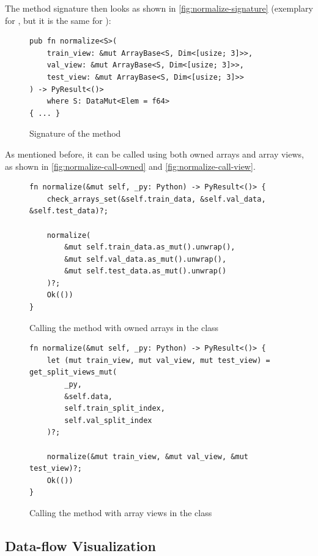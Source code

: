 \documentclass[review]{AIM_report}
\begin{document}
The method signature then looks as shown in \autoref{fig:normalize-signature} (exemplary for \normalize, but it is the same for \standardize):
\begin{figure}[H]
    \begin{lstlisting}[style=rust]
pub fn normalize<S>(
    train_view: &mut ArrayBase<S, Dim<[usize; 3]>>,
    val_view: &mut ArrayBase<S, Dim<[usize; 3]>>,
    test_view: &mut ArrayBase<S, Dim<[usize; 3]>>
) -> PyResult<()>
    where S: DataMut<Elem = f64>
{ ... }
    \end{lstlisting}
    \caption{Signature of the \normalize method}
    \label{fig:normalize-signature}
\end{figure}

As mentioned before, it can be called using both owned arrays and array views, as shown in \autoref{fig:normalize-call-owned} and \autoref{fig:normalize-call-view}.

\begin{figure}[H]
    \begin{lstlisting}[style=rust]
fn normalize(&mut self, _py: Python) -> PyResult<()> {
    check_arrays_set(&self.train_data, &self.val_data, &self.test_data)?;

    normalize(
        &mut self.train_data.as_mut().unwrap(),
        &mut self.val_data.as_mut().unwrap(),
        &mut self.test_data.as_mut().unwrap()
    )?;
    Ok(())
} 
    \end{lstlisting}
    \caption{Calling the \normalize method with owned arrays in the \classificationDataSet class}
    \label{fig:normalize-call-owned}
\end{figure}

\begin{figure}[H]
    \begin{lstlisting}[style=rust]
fn normalize(&mut self, _py: Python) -> PyResult<()> {
    let (mut train_view, mut val_view, mut test_view) = get_split_views_mut(
        _py,
        &self.data,
        self.train_split_index,
        self.val_split_index
    )?;

    normalize(&mut train_view, &mut val_view, &mut test_view)?;
    Ok(())
}
    \end{lstlisting}
    \caption{Calling the \normalize method with array views in the \forecastingDataSet class}
    \label{fig:normalize-call-view}
\end{figure}

\subsection{Data-flow Visualization}
\end{document}
